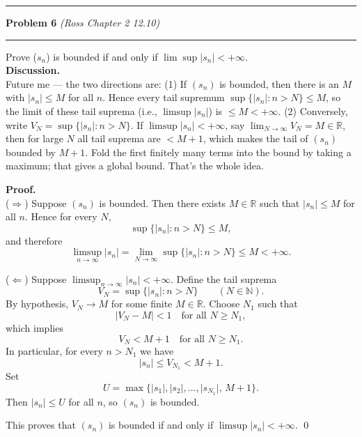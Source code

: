 \documentclass[12pt]{article}
\newcommand{\problem}[2][]{%
  \vspace{0.5em}
  \hrule\vspace{0.4em}
  \textbf{Problem #2}\if\relax\detokenize{#1}\relax\else\; \textit{(#1)}\fi
  \vspace{0.25em}\hrule\vspace{0.8em}
}
\begin{document}
\problem[Ross Chapter 2 12.10]{6}
Prove ($s_n$) is bounded if and only if $\lim \sup | s_n | < +\infty$.\\
\vspace{0.75em}
\textbf{Discussion.} \\
Future me — the two directions are:  
(1) If $(s_n)$ is bounded, then there is an $M$ with $\lvert s_n\rvert\le M$ for all $n$. Hence every tail supremum $\sup\{\lvert s_n\rvert:n>N\}\le M$, so the limit of these tail suprema (i.e., $\limsup\lvert s_n\rvert$) is $\le M<+\infty$.  
(2) Conversely, write $V_N=\sup\{\lvert s_n\rvert:n>N\}$. If $\limsup\lvert s_n\rvert<+\infty$, say $\lim_{N\to\infty}V_N=M\in\mathbb{R}$, then for large $N$ all tail suprema are $<M+1$, which makes the tail of $(s_n)$ bounded by $M+1$. Fold the first finitely many terms into the bound by taking a maximum; that gives a global bound. That’s the whole idea.

\vspace{0.25em}
\textbf{Proof.}\\
($\Rightarrow$) Suppose $(s_n)$ is bounded. Then there exists $M\in\mathbb{R}$ such that $\lvert s_n\rvert\le M$ for all $n$. Hence for every $N$,
\[
\sup\{\lvert s_n\rvert:n>N\}\le M,
\]
and therefore
\[
\limsup_{n\to\infty}\lvert s_n\rvert=\lim_{N\to\infty}\sup\{\lvert s_n\rvert:n>N\}\le M<+\infty.
\]

($\Leftarrow$) Suppose $\limsup_{n\to\infty}\lvert s_n\rvert<+\infty$. Define the tail suprema
\[
V_N=\sup\{\lvert s_n\rvert:n>N\}\qquad(N\in\mathbb{N}).
\]
By hypothesis, $V_N\to M$ for some finite $M\in\mathbb{R}$. Choose $N_1$ such that
\[
\lvert V_N-M\rvert<1\quad\text{for all }N\ge N_1,
\]
which implies
\[
V_N<M+1\quad\text{for all }N\ge N_1.
\]
In particular, for every $n>N_1$ we have
\[
\lvert s_n\rvert\le V_{N_1}<M+1.
\]
Set
\[
U=\max\bigl\{\lvert s_1\rvert,\lvert s_2\rvert,\dots,\lvert s_{N_1}\rvert,\,M+1\bigr\}.
\]
Then $\lvert s_n\rvert\le U$ for all $n$, so $(s_n)$ is bounded.

This proves that $(s_n)$ is bounded if and only if $\limsup\lvert s_n\rvert<+\infty$.
\qed
\end{document}
